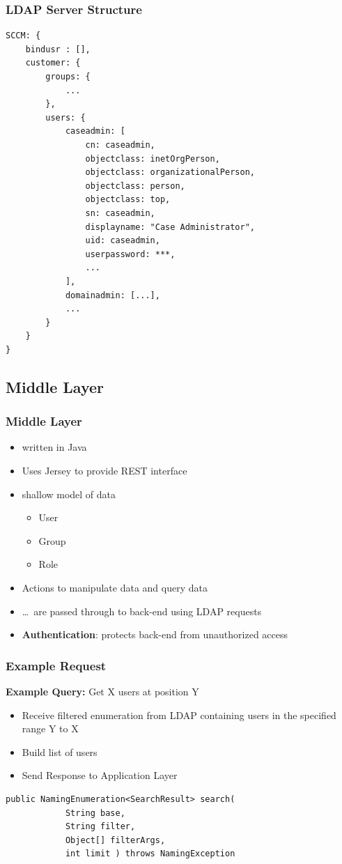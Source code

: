 \documentclass{beamer}
\begin{document}
\begin{frame}[fragile]
	\frametitle{LDAP Server Structure}
	\lstset{%
		basicstyle=\tiny
	}
	\begin{lstlisting}
SCCM: {
	bindusr : [],
	customer: {
		groups: {
			...
		},
		users: {
			caseadmin: [
				cn: caseadmin,
				objectclass: inetOrgPerson,
				objectclass: organizationalPerson,
				objectclass: person,
				objectclass: top,
				sn: caseadmin,
				displayname: "Case Administrator",
				uid: caseadmin,
				userpassword: ***,
				...
			],
			domainadmin: [...],
			...
		}
	}
}
	\end{lstlisting}
\end{frame}

\subsection{Middle Layer}

\begin{frame}
	\frametitle{Middle Layer}
	\begin{itemize}
		\item written in Java
		\item Uses Jersey to provide REST interface
		\item shallow model of data
			\begin{itemize}
				\item User
				\item Group
				\item Role
			\end{itemize}
		\item Actions to manipulate data and query data
		\item \dots\ are passed through to back-end using LDAP requests
		\item \textbf{Authentication}: protects back-end from
			unauthorized access
	\end{itemize}
\end{frame}

\begin{frame}[fragile]
	\frametitle{Example Request}
	\textbf{Example Query:} Get X users at position Y
	\begin{itemize}
	 \item Receive filtered enumeration from LDAP containing users in the specified range Y to X
	 \item Build list of users
	 \item Send Response to Application Layer
	\end{itemize}
\begin{lstlisting}[frame=single]
public NamingEnumeration<SearchResult> search(
            String base,
            String filter,
            Object[] filterArgs,
            int limit ) throws NamingException
\end{lstlisting}
\end{frame}
\end{document}
